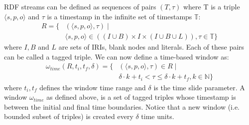 %
%
%
RDF streams can be defined as sequences of pairs $(T,\tau)$ where T is a triple  $\langle s,p,o \rangle$ and $\tau$ is a timestamp in the infinite set of timestamps $\mathbb{T}$:
\begin{align*}
R = \{ & ( \langle s,p,o \rangle, \tau) \mid \\ 
& \langle s,p,o \rangle \in ((I \cup B) \times I \times (I \cup B \cup L)  ), \tau \in \mathbb{T}\}
\end{align*}
where $I, B$ and $L$ are sets of IRIs, blank nodes and literals. Each of these pairs can be called a tagged triple. We can now define a time-based window as:
\begin{align*}
\omega_{time}(R,t_{i},t_{f},\delta)=\{ & (\langle s,p,o \rangle,\tau) \in R \mid \\
& \delta \cdotp k + t_{i}<\tau \leq \delta\cdotp k + t_{f} , k \in \mathbb{N}\}
\end{align*}
%
where $t_i, t_f$ defines the window time range and $\delta$ is the time slide parameter. A window $\omega_{time}$ as defined above, is a set of tagged triples whose timestamp is between the initial and final time boundaries. Notice that a new window (i.e. bounded subset of triples) is created every $\delta$ time units. 

